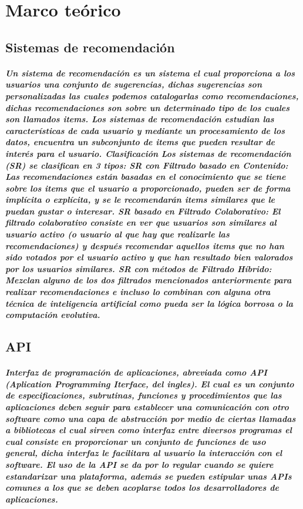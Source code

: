 \chapter {Marco teórico}
\section {Sistemas de recomendación}
  \paragraph {Un sistema de recomendación es un sistema el cual proporciona a los usuarios una conjunto de sugerencias, dichas sugerencias son personalizadas las cuales podemos catalogarlas como recomendaciones, dichas recomendaciones son sobre un determinado tipo de los cuales son llamados items. Los sistemas de recomendación estudian las características de cada usuario y mediante un procesamiento de los datos, encuentra un subconjunto de items que pueden resultar de interés para el usuario. Clasificación Los sistemas de recomendación (SR) se clasifican en 3 tipos: SR con Filtrado basado en Contenido: Las recomendaciones est\'an basadas en el conocimiento que se tiene sobre los items que el usuario a proporcionado, pueden ser de forma impl\'icita o expl\'icita, y se le recomendar\'an items similares que le puedan gustar o interesar. SR basado en Filtrado Colaborativo: El filtrado colaborativo consiste en ver que usuarios son similares al usuario activo (o usuario al que hay que realizarle las recomendaciones) y despu\'es recomendar aquellos items que no han sido votados por el usuario activo y que han resultado bien valorados por los usuarios similares. SR con m\'etodos de Filtrado H\'ibrido: Mezclan alguno de los dos filtrados mencionados anteriormente para realizar recomendaciones e incluso lo combinan con alguna otra t\'ecnica de inteligencia artificial como pueda ser la l\'ogica borrosa o la computaci\'on evolutiva.}

\section{API}
  \paragraph{Interfaz de programación de aplicaciones, abreviada como API (Aplication Programming Iterface, del ingles). El cual es un conjunto de especificaciones, subrutinas, funciones y procedimientos que las aplicaciones deben seguir para establecer una comunicación con otro software como una capa de abstracción por medio de ciertas llamadas a bibliotecas el cual sirven como interfaz entre diversos programas el cual consiste en proporcionar un conjunto de funciones de uso general, dicha interfaz le facilitara al usuario la interacción con el software. El uso de la API se da por lo regular cuando se quiere estandarizar una plataforma, además se pueden estipular unas APIs comunes a los que se deben acoplarse todos los desarrolladores de aplicaciones. }
  
